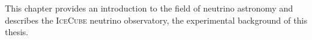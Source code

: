 This chapter provides
  an introduction to the field of neutrino astronomy
  and describes the \textsc{IceCube} neutrino observatory,
    the experimental background of this thesis.
